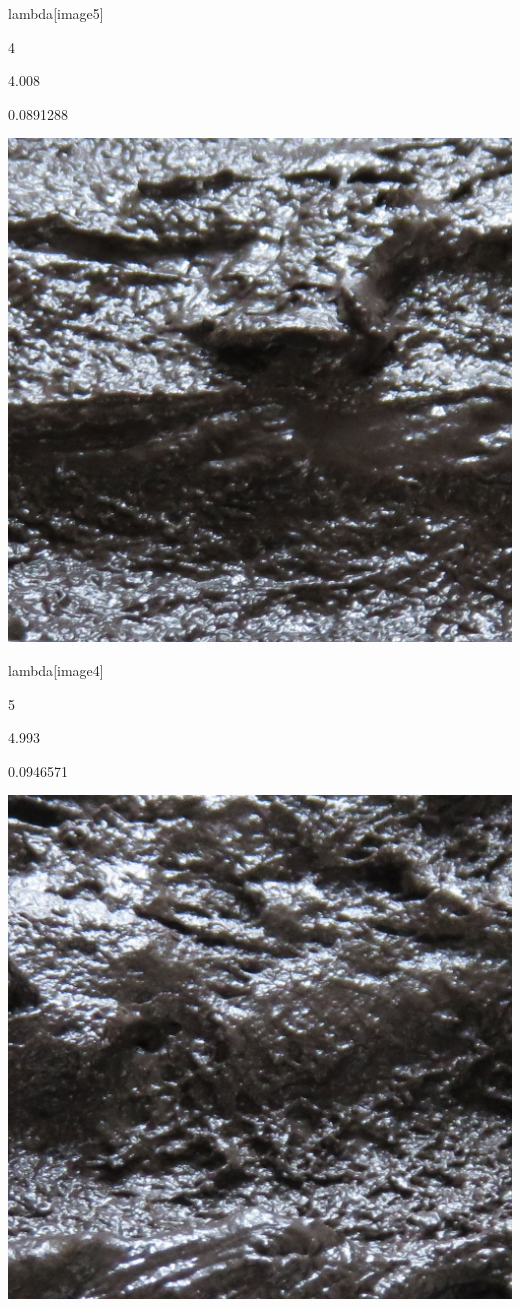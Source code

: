 \documentclass[
]{book}
\begin{document}
lambda{[}image5{]}

4

4.008

0.0891288

\includegraphics{data/moisture/Stimuli/image05.jpg}

lambda{[}image4{]}

5

4.993

0.0946571

\includegraphics{data/moisture/Stimuli/image04.jpg}
\end{document}
